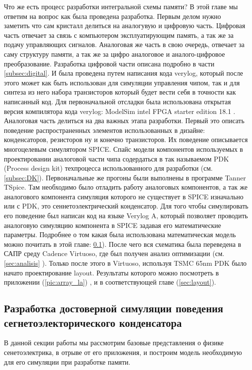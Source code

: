 \documentclass[a4paper,12pt]{article} %
\begin{document}
Что же есть процесс разработки интегральной схемы памяти? В этой главе мы ответим на вопрос как  была проведена разработка. Первым делом нужно заметить что сам кристалл делиться на аналогувую и цифровую часть. Цифровая часть отвечает за связь с компьютером эксплуатирующим память, а так же за подачу управляющих сигналов. 
Аналоговая же часть в свою очередь, отвечает за саму структуру памяти, а так же за цифро аналоговое и аналого-цифровое преобразование. Разработка цифровой части описана подробно в части \ref{subsec:digital}. И была проведена путем написания кода verylog, который после этого может как быть использован для симуляции управления чипом, так и для синтеза из него набора транзисторов который будет вести себя в точности как написанный код. Для первоначальной отсладки была использована открытая версия компилятора кода verylog: ModelSim intel FPGA starter edition 18.1 . Аналоговая часть делиться на два важных этапа разработки. Первый это описать поведение распространенных элементов использованных в дизайне: конденсаторов, резисторов ну и конечно транзисторов. Их  поведение описывается многоцелевым симулятором SPICE. Спайс модели компонентов используемых в проектировании аналоговой части чипа содердаться в так называемом PDK (Process design kit) техпроцесса использованного для разработки (см. \ref{subsec:DK}). Первоначальные же прогоны были выполнены в программе Tanner TSpice. Там необходимо было отладить работу аналоговых компонентов, а так же аналогового компонента симуляция которого не существует в SPICE изначально или с PDK, это сеннетоэлектрический конденсатор. Для того чтобы симулировать его поведение был написан код на языке Verylog A, который позволяет проводить аналоговую симуляцию компонента в SPICE задавая его математические параметры. Подробнее о том какая была использована  математическая модель можно почитать в этой главе: \ref{subsec:va}). После чего вся схематика была переведена в САПР среду Cadence Virtuoso, где был получен анализ оптимизации (см. \ref{sec:analisis} ). Только после этого в Virtuoso, используя TSMC 65nm PDK было начато проектирование layout. Результаты которого можно посмотреть в приложении (\ref{pic:array_la}) , и в соответствующей главе (\ref{sec:layout}).

\subsection{Разработка достоверной симуляции поведения сегнетоэлекторического конденсатора}
\label{subsec:va}
В данной секции работы мы рассмотрим базовые представления о физике сенетоэлектрика, в отрыве от его приложения, и построим модель необходимую для его симуляции при разработке памяти.
\end{document}
